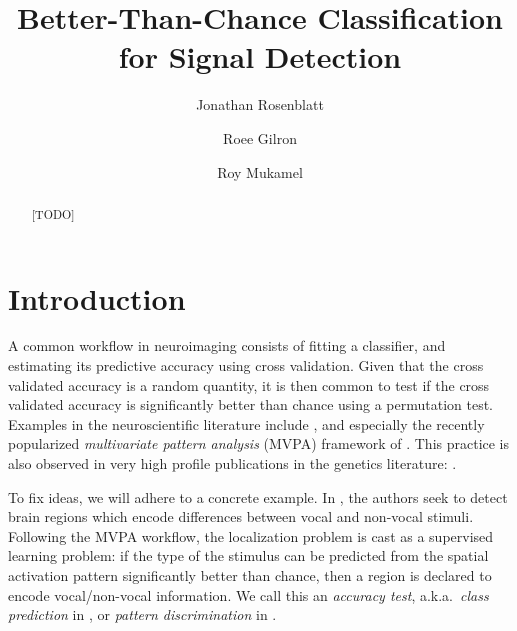 \documentclass[12pt,a4paper]{article}
\author{Jonathan Rosenblatt \and Roee Gilron \and Roy Mukamel}
\title{Better-Than-Chance Classification for Signal Detection}
\begin{document}


\maketitle
\linenumbers

\begin{abstract}
[TODO]
\end{abstract}


\section{Introduction}
\label{sec:introduction}

A common workflow in neuroimaging consists of fitting a classifier, and estimating its predictive accuracy using cross validation. 
Given that the cross validated accuracy is a random quantity, it is then common to test if the cross validated accuracy is significantly better than chance using a permutation test.  
Examples in the neuroscientific literature include \citet{golland_permutation_2003,pereira_machine_2009,varoquaux_assessing_2016}, and especially the recently popularized \emph{multivariate pattern analysis} (MVPA) framework of \citet{kriegeskorte_information-based_2006}.
This practice is also observed in very high profile publications in the genetics literature: 
\citet{golub_molecular_1999,slonim_class_2000,radmacher_paradigm_2002,mukherjee_estimating_2003,juan_prediction_2004,jiang_calculating_2008}.


To fix ideas, we will adhere to a concrete example.
In \cite{gilron_quantifying_2016}, the authors seek to detect brain regions which encode differences between vocal and non-vocal stimuli. 
Following the MVPA workflow, the localization problem is cast as a supervised learning problem: if the type of the stimulus can be predicted from the spatial activation pattern significantly better than chance, then a region is declared to encode vocal/non-vocal information. 
We call this an \emph{accuracy test}, a.k.a.\ \emph{class prediction} in \cite{simon_pitfalls_2003}, or \emph{pattern discrimination} in \cite{pereira_machine_2009}.
\end{document}
